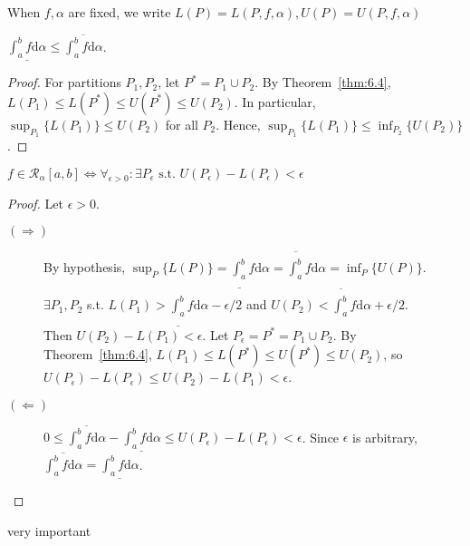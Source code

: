 \begin{notation}
	When $f,\alpha$ are fixed, we write $L(P)=L(P,f,\alpha),U(P)=U(P,f,\alpha)$
\end{notation}

\begin{thm}[5]
	$\underline{\int_{a}^{b}{f\mathrm{d}\alpha}}\le  \overline{\int_{a}^{b}{f\mathrm{d}\alpha}}$.
	\begin{proof}
		For partitions $P_1,P_2$, let $P^{*}=P_1 \cup P_2$.
		By Theorem~\ref{thm:6.4}, $L(P_1)\le L(P^{*})\le U(P^{*})\le U(P_2)$.
		In particular, $\sup_{P_1}\{L(P_1)\}\le U(P_2)$ for all $P_2$.
		Hence, $\sup_{P_1}\{L(P_1)\}\le \inf_{P_2}\{U(P_2)\}$.
	\end{proof}
\end{thm}
\begin{thm}[6]
	$f \in \mathscr{R}_{\alpha}[a,b]\Leftrightarrow \forall_{\epsilon > 0}: \exists P_{\epsilon} \text{ s.t. } U(P_{\epsilon})-L(P_{\epsilon})<\epsilon$
	\begin{proof}
		Let $\epsilon>0$.
		\begin{description}
			\item[$(\Rightarrow)$]
			      By hypothesis, $\sup_{P}\{L(P)\}= \underline{\int_{a}^{b}}f\mathrm{d}\alpha=\overline{\int_{a}^{b}}f\mathrm{d}\alpha=\inf_{P}\{U(P)\}$.\\
			      $\exists P_1,P_2$ s.t. $L(P_1)>\underline{\int_{a}^{b}}f\mathrm{d}\alpha-\epsilon/2$ and $U(P_2)<\overline{\int_{a}^{b}}f\mathrm{d}\alpha+\epsilon/2$.\\
			      Then $U(P_{2})-L(P_{1})<\epsilon$. Let $P_{\epsilon}=P^{*}=P_{1}\cup P_{2}$.
			      By Theorem~\ref{thm:6.4}, $L(P_{1})\le L(P^{*})\le U(P^{*})\le U(P_{2})$, so $U(P_{\epsilon})-L(P_{\epsilon})\le U(P_2)-L(P_1)<\epsilon$.
			\item[$(\Leftarrow)$]
			      $0\le \overline{\int_{a}^{b}{f\mathrm{d}\alpha}} - \underline{\int_{a}^{b}{f\mathrm{d}\alpha}}\le U(P_{\epsilon})-L(P_{\epsilon})<\epsilon$. Since $\epsilon$ is arbitrary, $\overline{\int_{a}^{b}{f\mathrm{d}\alpha}} = \underline{\int_{a}^{b}{f\mathrm{d}\alpha}}$.
		\end{description}
	\end{proof}
	\begin{remark}
		very important
	\end{remark}
\end{thm}

